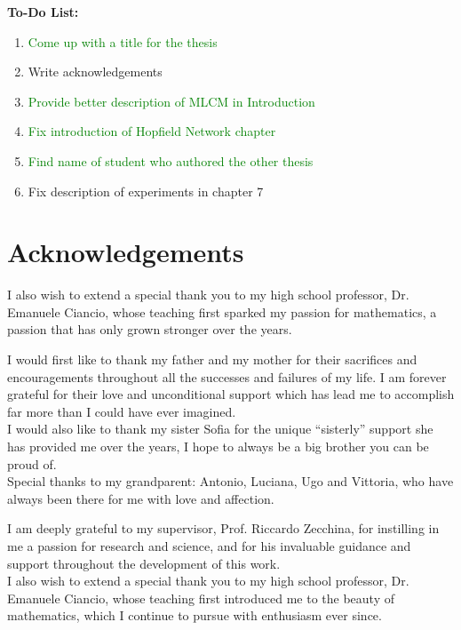 \documentclass[a4paper,12pt]{report}
\begin{document}

\thispagestyle{empty}
\noindent
\textbf{To-Do List:}
\vspace*{0.5em} \\
\begin{enumerate}
    \item {\textcolor{green}{Come up with a title for the thesis}}
    \item Write acknowledgements
    \item \textcolor{green}{Provide better description of MLCM in Introduction}
    \item {\textcolor{green}{Fix introduction of Hopfield Network chapter}}
    \item \textcolor{green}{Find name of student who authored the other thesis}
    \item Fix description of experiments in chapter 7
\end{enumerate}


\thispagestyle{empty}\mbox{}\newpage
\thispagestyle{empty}\mbox{}\newpage
\thispagestyle{empty}
\chapter*{Acknowledgements}
I also wish to extend a special thank you to my high school professor, Dr. Emanuele Ciancio, 
whose teaching first sparked my passion for mathematics, a passion that has only grown 
stronger over the years.

I would first like to thank my father and my mother for their sacrifices and 
encouragements throughout all the successes and failures of my life. I am forever 
grateful for their love and unconditional support which has lead me to accomplish far 
more than I could have ever imagined.\\ 
I would also like to thank my sister Sofia for the unique ``sisterly'' support she 
has provided me over the years, I hope to always be a big brother you can be proud of. \\
Special thanks to my grandparent: Antonio, Luciana, Ugo and Vittoria, who have always 
been there for me with love and affection.

I am deeply grateful to my supervisor, Prof. Riccardo Zecchina, for instilling in me 
a passion for research and science, and for his invaluable guidance and support 
throughout the development of this work.\\
I also wish to extend a special thank you to my high school professor, Dr. Emanuele Ciancio, 
whose teaching first introduced me to the beauty of mathematics, which I continue to 
pursue with enthusiasm ever since.
\end{document}
